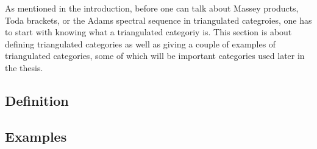 As mentioned in the introduction, before one can talk about Massey products, Toda brackets, or the Adams spectral sequence in triangulated categroies, one has to start with knowing what a triangulated categoriy is. This section is about defining triangulated categories as well as giving a couple of examples of triangulated categories, some of which will be important categories used later in the thesis.

\subsection{Definition}


\subsection{Examples}
